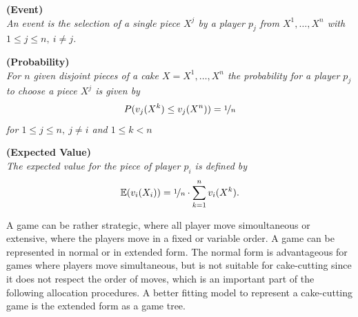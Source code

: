 \begin{defi}{\textbf{(Event)}}\\
\emph{An \emph{event} is the selection of a single piece $X^j$ by a player $p_j$ from $X^1, \ldots, X^n$ with $1 \leq j \leq n,\: i \neq j$.}
\end{defi}
\begin{defi}{\textbf{(Probability)}}\\
\emph{For $n$ given disjoint pieces of a cake $X=X^1, \ldots, X^n$ the \emph{probability} for a player $p_j$ to 
choose a piece $X^j$ is given by $${P}(v_j(X^k) \leq v_j(X^n))=\nicefrac{1}{n}$$ for $1 \leq j \leq n,\: j\neq i$ and $1 \leq k < n$} 
\end{defi}
\begin{defi}{\textbf{(Expected Value)}}\\
\emph{The \emph{expected value} for the piece of player $p_i$ is defined by $$\mathbb{E}(v_i(X_i))= \nicefrac{1}{n} \cdot \sum\limits_{k=1}^n v_i(X^k).$$} 
\end{defi}
A game can be rather strategic, where all player move simoultaneous or extensive, where the players move in a fixed or variable order. A game can be represented in normal or in extended form. The normal form is advantageous for games where players move simultaneous, but is not suitable for cake-cutting since it does not respect the order of moves, which is an important part of the following allocation procedures. A better fitting model to represent a cake-cutting game is the extended form as a game tree.
\newpage
{}
